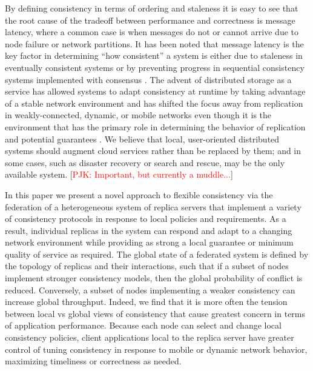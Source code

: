 \documentclass[10pt,conference,letterpaper]{IEEEtran}
\newcommand{\todo}[1]{{\textcolor{red}{#1}}}
\newcommand{\pjk}[1]{[\todo{PJK: #1}]}
\begin{document}
By defining consistency in terms of ordering and staleness it is easy to see that the root
cause of the tradeoff between performance and correctness is message latency, where a
common case is when messages do not or cannot arrive due to node failure or network
partitions.
It has been noted that message latency is the key factor in determining ``how consistent''
a system is either due to staleness in eventually consistent systems
\cite{bailis_probabilistically_2012} or by preventing progress in sequential consistency
systems implemented with consensus \cite{howard_raft_2015}.
The advent of distributed storage as a service has allowed systems to adapt consistency at
runtime by taking advantage of a stable network environment
\cite{chihoub_harmony:_2012,chihoub_consistency_2013,kraska_consistency_2009} and has
shifted the focus away from replication in weakly-connected, dynamic, or mobile networks
even though it is the environment that has the primary role in determining the behavior of
replication and potential guarantees \cite{pitoura_data_1999,deno-toc}.
We believe that local, user-oriented distributed systems should augment
cloud services rather than be replaced by them; and in some cases, such as disaster
recovery or search and rescue, may be the only available system.
\pjk{Important, but currently a muddle...}

In this paper we present a novel approach to flexible consistency via the federation of a
heterogeneous system of replica servers that implement a variety of consistency protocols
in response to local policies and requirements.
As a result, individual replicas in the system can respond and adapt to a changing network
environment while providing as strong a local guarantee or minimum quality of service as
required.
The global state of a federated system is defined by the topology of replicas and their
interactions, such that if a subset of nodes implement stronger consistency models, then
the global probability of conflict is reduced.
Conversely, a subset of nodes
implementing a weaker consistency can increase global throughput.
Indeed, we find that it is more often the tension between local vs global views of
consistency that cause greatest concern in terms of application performance.
Because each node can select and change local consistency policies, client applications
local to the replica server have greater control of tuning consistency in response to
mobile or dynamic network behavior, maximizing timeliness or correctness as needed.
\end{document}
